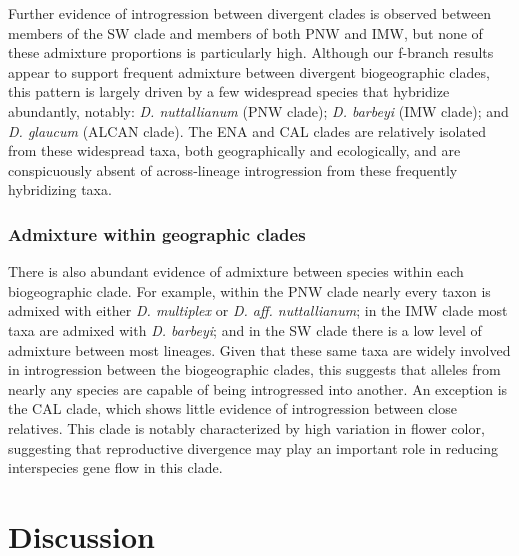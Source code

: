 \documentclass[11pt]{article}
\begin{document}
Further evidence of introgression between divergent clades is observed between
members of the SW clade and members of both PNW and IMW, but none of these 
admixture proportions is particularly high.
% 
Although our f-branch results appear to support frequent admixture between divergent
biogeographic clades, this pattern is largely driven by a few widespread species that
hybridize abundantly, notably: \emph{D. nuttallianum} (PNW clade); 
\emph{D. barbeyi} (IMW clade); 
and \emph{D. glaucum} (ALCAN clade). 
% 
The ENA and CAL clades are relatively isolated from these widespread taxa, both 
geographically and ecologically, and are conspicuously absent of across-lineage
introgression from these frequently hybridizing taxa.



\subsubsection{Admixture within geographic clades}

There is also abundant evidence of admixture between species within each 
biogeographic clade.
% 
For example, within the PNW clade nearly every taxon is admixed with either 
\emph{D. multiplex} or \emph{D. aff. nuttallianum}; in the IMW clade most taxa
are admixed with \emph{D. barbeyi}; and in the SW clade there is a low level of
admixture between most lineages.
% 
Given that these same taxa are widely involved in introgression between the
biogeographic clades, this suggests that alleles from nearly any species are
capable of being introgressed into another.
% 
An exception is the CAL clade, which shows little evidence of introgression between 
close relatives. 
This clade is notably characterized by high variation in flower color, 
suggesting that reproductive divergence may play an important role in 
reducing interspecies gene flow in this clade.

\section{Discussion}
\end{document}
